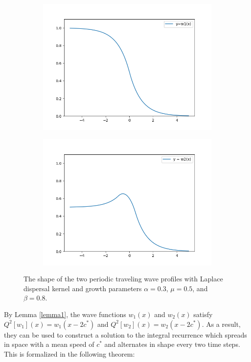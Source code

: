 \documentclass[11pt]{article}
\theoremstyle{definition}
\numberwithin{equation}{section}
\numberwithin{thm}{section}
\begin{document}
\begin{figure}
\centering
\begin{subfigure}{.5\textwidth}
  \centering
  \includegraphics[width=.9\linewidth]{figures/fig2A.png}
  \label{fig:sub1}
\end{subfigure}%
\begin{subfigure}{.5\textwidth}
  \centering
  \includegraphics[width=.9\linewidth]{figures/fig2B.png}
  \label{fig:sub2}
\end{subfigure}
\caption{The shape of the two periodic traveling wave profiles with Laplace dispersal kernel and growth parameters $\alpha=0.3$, $\mu=0.5$, and $\beta=0.8$.}
\label{fig:test}
\end{figure}

By Lemma \ref{lemma1}, the wave functions $w_1(x)$ and $w_2(x)$ satisfy $Q^2[w_1](x)=w_1(x-2c^*)$ and $Q^2[w_2](x)=w_2(x-2c^*)$. As a result, they can be used to construct a solution to the integral recurrence which spreads in space with a mean speed of $c^*$ and alternates in shape every two time steps. This is formalized in the following theorem:
\end{document}
